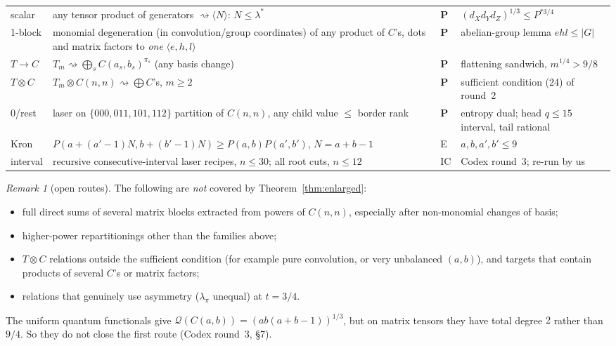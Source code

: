 \documentclass[11pt]{amsart}
\theoremstyle{remark}
\newtheorem{remark}[theorem]{Remark}
\newcommand{\degen}{\mathrel{\rightsquigarrow}}
\begin{document}
{\begin{longtable}{p{}p{}p{}p{}}
scalar & any tensor product of generators $\degen\langle N\rangle$: $N\le
\lambda^*$ & \textbf{P} & $(d_Xd_Yd_Z)^{1/3}\le P^{*3/4}$\\
1-block & monomial degeneration (in convolution/group coordinates) of any
product of $C$'s, dots and matrix factors to \emph{one}
$\langle e,h,l\rangle$ & \textbf{P} & abelian-group lemma $ehl\le|G|$\\
$T\to C$ & $T_m\degen\bigoplus_sC(a_s,b_s)^{\pi_s}$ (any basis change) &
\textbf{P} & flattening sandwich, $m^{1/4}>9/8$\\
$T\otimes C$ & $T_m\otimes C(n,n)\degen\bigoplus C$'s, $m\ge2$ &
\textbf{P} & sufficient condition (24) of round~2\\
0/rest & laser on $\{000,011,101,112\}$ partition of $C(n,n)$, any child
value $\le$ border rank & \textbf{P} & entropy dual; head $q\le15$ interval,
tail rational\\
Kron & $P(a+(a'-1)N,b+(b'-1)N)\ge P(a,b)P(a',b')$, $N=a+b-1$ & E & $a,b,a',b'\le9$\\
interval & recursive consecutive-interval laser recipes, $n\le30$; all root
cuts, $n\le12$ & IC & Codex round~3; re-run by us\\
\bottomrule
\end{longtable}
}

\begin{remark}[open routes]
The following are \emph{not} covered by Theorem~\ref{thm:enlarged}:
\begin{itemize}
\item full direct sums of several matrix blocks extracted from powers of
$C(n,n)$, especially after non-monomial changes of basis;
\item higher-power repartitionings other than the families above;
\item $T\otimes C$ relations outside the sufficient condition (for example
pure convolution, or very unbalanced $(a,b)$), and targets that contain
products of several $C$'s or matrix factors;
\item relations that genuinely use asymmetry ($\lambda_\pi$ unequal) at
$t=3/4$.
\end{itemize}
The uniform quantum functionals give
$\mathcal Q(C(a,b))=(ab(a+b-1))^{1/3}$, but on matrix tensors they have total
degree $2$ rather than $9/4$. So they do not close the first route
(Codex round~3, \S7).
\end{remark}
\end{document}
